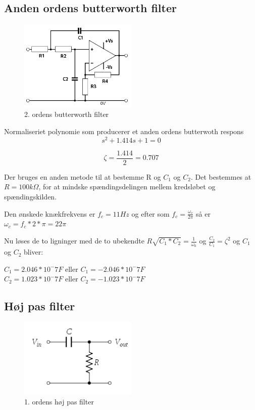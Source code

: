 \subsection{Anden ordens butterworth filter}
\begin{figure}[H]
	\centering
	\includegraphics[width = 0.5\textwidth]{billeder/2ordensButterworth.png}
	\caption{2. ordens butterworth filter}\label{fig:butterworth}
\end{figure}
Normaliseriet polynomie som producerer et anden ordens butterwoth respons 
\begin{equation}
	s^2 + 1.414s +1 = 0 
\end{equation}

\begin{equation}
	\zeta = \frac{1.414}{2} = 0.707
\end{equation}

Der bruges en anden metode til at bestemme R og $C_1$ og $C_2$. Det bestemmes at $R = 100k \Omega $, for at mindske spændingsdelingen mellem kredsløbet og spændingskilden.

Den ønskede knækfrekvens er $f_c = 11Hz$ og efter som $f_c = \frac{\omega_c}{2 \pi} $ så er $\omega_c = f_c * 2 * \pi = 22 \pi $

Nu løses de to ligninger med de to ubekendte $R \sqrt{C_1 * C_2} = \frac{1}{\omega_0}$ og $ \frac{C_2}{C_1} = \zeta^2$ og $C_1$ og $C_2$ bliver:

$C_1 = 2.046*10^-7F$ eller $ C_1 = -2.046*10^-7F$ \\
$C_2 = 1.023*10^-7F$ eller $ C_2 = -1.023*10^-7F$ \\

\subsection{Høj pas filter}
\begin{figure}[H]
	\centering
	\includegraphics[width = 0.5\textwidth]{billeder/HighPass.png}
	\caption{1. ordens høj pas filter}\label{fig:highpass}
\end{figure}

